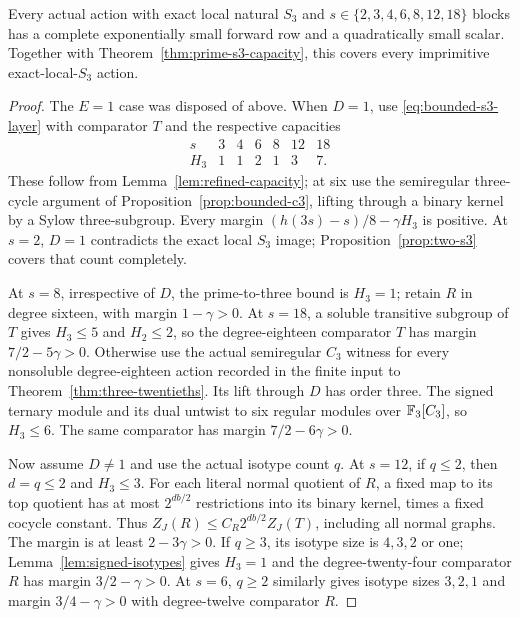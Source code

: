 \begin{theorem}\label{thm:bounded-s3}
Every actual action with exact local natural $S_3$ and
$s\in\{2,3,4,6,8,12,18\}$ blocks has a complete exponentially
small forward row and a quadratically small scalar. Together with
Theorem~\ref{thm:prime-s3-capacity}, this covers every imprimitive
exact-local-$S_3$ action.
\end{theorem}
\begin{proof}
The $E=1$ case was disposed of above. When $D=1$, use
\eqref{eq:bounded-s3-layer} with comparator $T$ and the respective
capacities
\[
 \begin{array}{c|rrrrrr}s&3&4&6&8&12&18\\\hline
 H_3&1&1&2&1&3&7.\end{array}
\]
These follow from Lemma~\ref{lem:refined-capacity}; at six use
the semiregular three-cycle argument of Proposition~\ref{prop:bounded-c3},
lifting through a binary kernel by a Sylow three-subgroup. Every
margin $(h(3s)-s)/8-\gamma H_3$ is positive. At $s=2$, $D=1$
contradicts the exact local $S_3$ image; Proposition~\ref{prop:two-s3}
covers that count completely.

At $s=8$, irrespective of $D$, the prime-to-three bound is $H_3=1$;
retain $R$ in degree sixteen, with margin $1-\gamma>0$.
At $s=18$, a soluble transitive subgroup of $T$ gives $H_3\leq5$
and $H_2\leq2$, so the degree-eighteen comparator $T$ has margin
$7/2-5\gamma>0$. Otherwise use the actual semiregular $C_3$
witness for every nonsoluble degree-eighteen action recorded in the
finite input to Theorem~\ref{thm:three-twentieths}. Its lift through
$D$ has order three. The signed ternary module and its dual
untwist to six regular modules over $\mathbb F_3[C_3]$, so $H_3\leq6$.
The same comparator has margin $7/2-6\gamma>0$.

Now assume $D\ne1$ and use the actual isotype count $q$.
At $s=12$, if $q\leq2$, then $d=q\leq2$ and $H_3\leq3$.
For each literal normal quotient of $R$, a fixed map to its top
quotient has at most $2^{db/2}$ restrictions into its binary
kernel, times a fixed cocycle constant. Thus
$Z_J(R)\leq C_R2^{db/2}Z_J(T)$, including all normal graphs.
The margin is at least $2-3\gamma>0$.
If $q\geq3$, its isotype size is $4,3,2$ or one;
Lemma~\ref{lem:signed-isotypes} gives $H_3=1$ and the
degree-twenty-four comparator $R$ has margin $3/2-\gamma>0$.
At $s=6$, $q\geq2$ similarly gives isotype sizes $3,2,1$ and
margin $3/4-\gamma>0$ with degree-twelve comparator $R$.


\end{proof}
